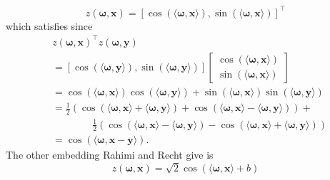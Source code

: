 \begin{equation} \label{eq: rff_emb}
    z \left( \bm{\omega}, \bm{x} \right) = \left[ \cos \left( \langle \bm{\omega} , \bm{x} \rangle \right) , \sin \left( \langle \bm{\omega} , \bm{x} \rangle \right) \right]^{\intercal}
\end{equation}
which satisfies   since
\begin{align*}
     & z \left( \bm{\omega}, \bm{x} \right)^{\intercal} z \left( \bm{\omega}, \bm{y} \right)                                                                                                                                                      \\
     & =
    \left[ \cos \left( \langle \bm{\omega} , \bm{y} \rangle \right), \sin \left( \langle \bm{\omega} , \bm{y} \rangle \right)  \right]
    \begin{bmatrix}
        \cos \left( \langle \bm{\omega} , \bm{x} \rangle \right) \\ \sin \left( \langle \bm{\omega} , \bm{x} \rangle \right)
    \end{bmatrix}                                                                                                                                                                                                                     \\
     & = \cos \left( \langle \bm{\omega} , \bm{x} \rangle \right) \cos \left( \langle \bm{\omega} , \bm{y} \rangle \right) + \sin \left( \langle \bm{\omega} , \bm{x} \rangle \right) \sin \left( \langle \bm{\omega} , \bm{y} \rangle \right)    \\
     & = \frac{1}{2} \left( \cos \left( \langle \bm{\omega} , \bm{x} \rangle + \langle \bm{\omega} , \bm{y} \rangle \right) + \cos \left( \langle \bm{\omega} , \bm{x} \rangle - \langle \bm{\omega} , \bm{y} \rangle \right) \right) +           \\
     & \qquad \qquad \frac{1}{2} \left( \cos \left( \langle \bm{\omega} , \bm{x} \rangle - \langle \bm{\omega} , \bm{y} \rangle \right) - \cos \left( \langle \bm{\omega} , \bm{x} \rangle + \langle \bm{\omega} , \bm{y} \rangle \right) \right) \\
     & = \cos \left( \langle \bm{\omega} , \bm{x} - \bm{y} \rangle \right).
\end{align*}
The other embedding Rahimi and Recht give is
\begin{equation} \label{eq: rff_emb_alt}
    z \left( \bm{\omega}, \bm{x} \right) = \sqrt{2} \cos \left(  \langle \bm{\omega} , \bm{x} \rangle + b \right)
\end{equation}
